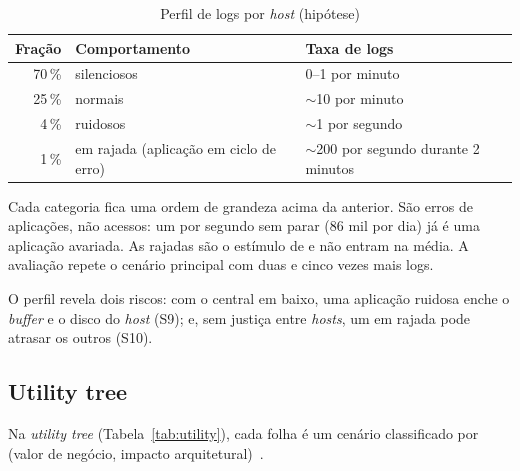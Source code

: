 \begin{table}[htbp]
  \centering\small
  \caption{Perfil de logs por \emph{host} (hipótese)}
  \label{tab:perfil-logs}
  \begin{tabular}{rll}
    \toprule
    Fração & Comportamento & Taxa de logs \\
    \midrule
    70\,\% & silenciosos & 0--1 por minuto \\
    25\,\% & normais & $\sim$10 por minuto \\
    4\,\% & ruidosos & $\sim$1 por segundo \\
    1\,\% & em rajada (aplicação em ciclo de erro) & $\sim$200 por segundo durante 2 minutos \\
    \bottomrule
  \end{tabular}
\end{table}

Cada categoria fica uma ordem de grandeza acima da anterior. São erros de aplicações, não acessos: um por segundo
sem parar (86 mil por dia) já é uma aplicação avariada. As rajadas são o estímulo de  e não entram na média.
A avaliação repete o cenário principal com duas e cinco vezes mais logs.

O perfil revela dois riscos: com o central em baixo, uma aplicação ruidosa enche o \emph{buffer} e o disco do
\emph{host} (S9); e, sem justiça entre \emph{hosts}, um em rajada pode atrasar os outros (S10).

\subsection{Utility tree}

Na \emph{utility tree} (Tabela~\ref{tab:utility}), cada folha é um cenário classificado por (valor de negócio,
impacto arquitetural)~\cite{bastofernandes2026}.

